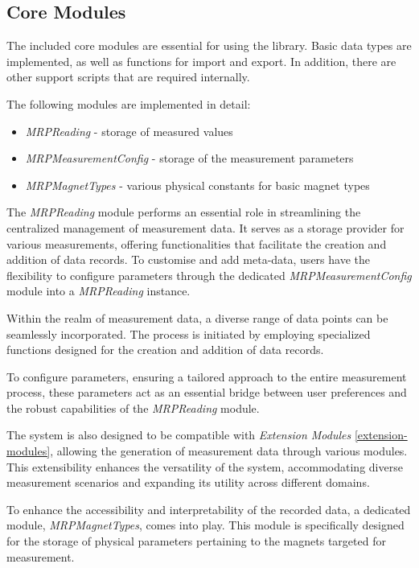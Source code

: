 \hypertarget{core-modules}{%
\subsection{Core Modules}\label{core-modules}}

The included core modules are essential for using the library. Basic
data types are implemented, as well as functions for import and export.
In addition, there are other support scripts that are required
internally.

The following modules are implemented in detail:

\begin{itemize}
\tightlist
\item
  \emph{MRPReading} - storage of measured values
\item
  \emph{MRPMeasurementConfig} - storage of the measurement parameters
\item
  \emph{MRPMagnetTypes} - various physical constants for basic magnet
  types
\end{itemize}

The \emph{MRPReading} module performs an essential role in streamlining
the centralized management of measurement data. It serves as a storage
provider for various measurements, offering functionalities that
facilitate the creation and addition of data records. To customise and
add meta-data, users have the flexibility to configure parameters
through the dedicated \emph{MRPMeasurementConfig} module into a
\emph{MRPReading} instance.

Within the realm of measurement data, a diverse range of data points can
be seamlessly incorporated. The process is initiated by employing
specialized functions designed for the creation and addition of data
records.

To configure parameters, ensuring a tailored approach to the entire
measurement process, these parameters act as an essential bridge between
user preferences and the robust capabilities of the \emph{MRPReading}
module.

The system is also designed to be compatible with \emph{Extension
Modules} \ref{extension-modules}, allowing the generation of measurement
data through various modules. This extensibility enhances the
versatility of the system, accommodating diverse measurement scenarios
and expanding its utility across different domains.

To enhance the accessibility and interpretability of the recorded data,
a dedicated module, \emph{MRPMagnetTypes}, comes into play. This module
is specifically designed for the storage of physical parameters
pertaining to the magnets targeted for measurement.

